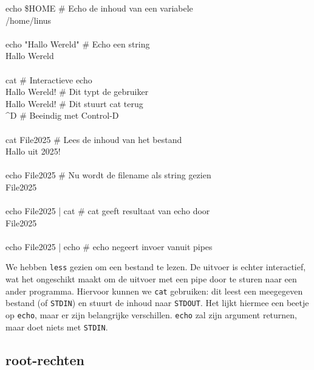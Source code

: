 \begin{bash}
\userprompt echo  \$HOME             \# Echo de inhoud van een variabele\\
/home/linus\\
\\
\userprompt echo "Hallo Wereld"     \# Echo een string\\
Hallo Wereld\\
\\
\userprompt cat                     \# Interactieve echo\\
Hallo Wereld!                                \# Dit typt de gebruiker\\
Hallo Wereld!                                \# Dit stuurt cat terug\\
\textasciicircum D                                           \# Beeindig met Control-D\\
\\
\userprompt cat File2025            \# Lees de inhoud van het bestand\\
Hallo uit 2025!\\
\\
\userprompt echo File2025           \# Nu wordt de filename als string gezien\\
File2025\\
\\
\userprompt echo File2025 | cat     \# cat geeft resultaat van echo door\\
File2025\\
\\
\userprompt echo File2025 | echo    \# echo negeert invoer vanuit pipes\\
\end{bash}

We hebben \texttt{less} gezien om een bestand te lezen. De uitvoer is echter interactief, wat het ongeschikt maakt om de uitvoer met een pipe door te sturen naar een ander programma. Hiervoor kunnen we \texttt{cat} gebruiken: dit leest een meegegeven bestand (of \texttt{STDIN}) en stuurt de inhoud naar \texttt{STDOUT}. Het lijkt hiermee een beetje op \texttt{echo}, maar er zijn belangrijke verschillen. \texttt{echo} zal zijn argument returnen, maar doet niets met \texttt{STDIN}.


\subsection{root-rechten}\label{root-rechten}

